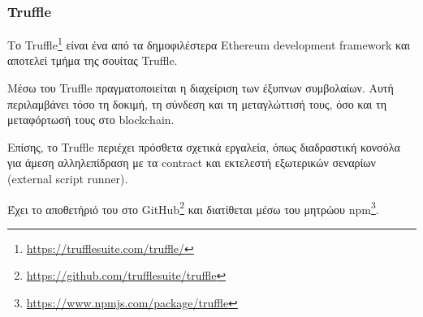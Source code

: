 \subsubsection{Truffle} \label{subsection:4-2-3-1-truffle}


Το Truffle\footnote{\url{https://trufflesuite.com/truffle/}} είναι ένα από τα δημοφιλέστερα Ethereum development framework και αποτελεί τμήμα της σουίτας Truffle.

Μέσω του Truffle πραγματοποιείται η διαχείριση των έξυπνων συμβολαίων. Αυτή περιλαμβάνει τόσο τη δοκιμή, τη σύνδεση και τη μεταγλώττισή τους, όσο και τη μεταφόρτωσή τους στο blockchain.

Επίσης, το Truffle περιέχει πρόσθετα σχετικά εργαλεία, όπως διαδραστική κονσόλα για άμεση αλληλεπίδραση με τα contract και εκτελεστή εξωτερικών σεναρίων (external script runner). 

Έχει το αποθετήριό του στο GitHub\footnote{\url{https://github.com/trufflesuite/truffle}} και διατίθεται μέσω του μητρώου npm\footnote{\url{https://www.npmjs.com/package/truffle}}.